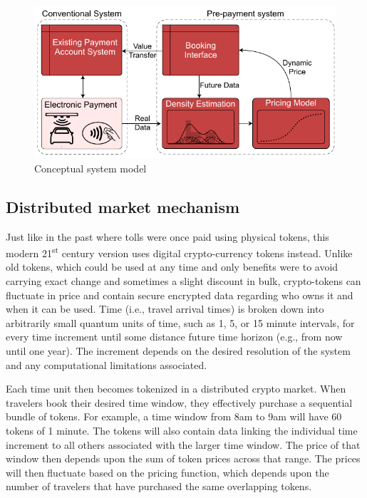 \documentclass[10pt, letter, twocolumn]{article} %
\begin{document}
\begin{figure}[h]
	\includegraphics[width=\linewidth]{figures/systemmodel}
	\centering
	\caption{Conceptual system model}
	\label{fig:systemmodel}
\end{figure}

\subsection{Distributed market mechanism}
Just like in the past where tolls were once paid using physical tokens, this modern 21\textsuperscript{st} century version uses digital crypto-currency tokens instead. Unlike old tokens, which could be used at any time and only benefits were to avoid carrying exact change and sometimes a slight discount in bulk, crypto-tokens can fluctuate in price and contain secure encrypted data regarding who owns it and when it can be used. Time (i.e., travel arrival times) is broken down into arbitrarily small quantum units of time, such as 1, 5, or 15 minute intervals, for every time increment until some distance future time horizon (e.g., from now until one year). The increment depends on the desired resolution of the system and any computational limitations associated. 

Each time unit then becomes tokenized in a distributed crypto market. When travelers book their desired time window, they effectively purchase a sequential bundle of tokens. For example, a time window from 8am to 9am will have 60 tokens of 1 minute. The tokens will also contain data linking the individual time increment to all others associated with the larger time window. The price of that window then depends upon the sum of token prices across that range. The prices will then fluctuate based on the pricing function, which depends upon the number of travelers that have purchased the same overlapping tokens.
\end{document}
